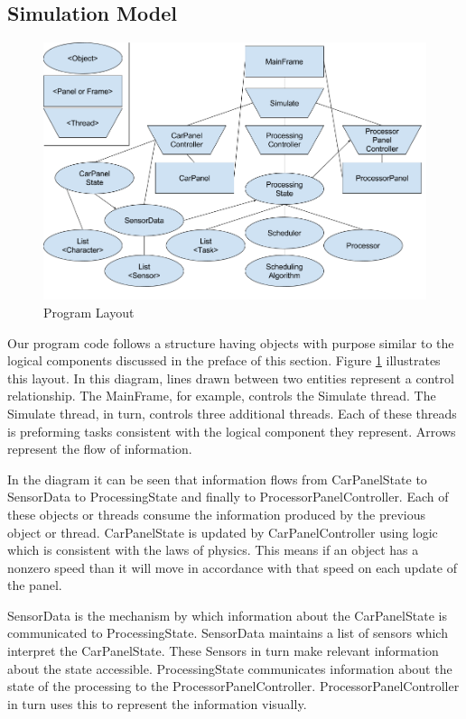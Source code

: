 \documentclass{article} %
\begin{document}
\subsection{Simulation Model}
\begin{figure}[!hbt]
\begin{center}
\includegraphics[width=.4\textwidth,keepaspectratio]{code_layout.png}
\end{center}
\caption{Program Layout}
\label{FIG-DIAGRAM}
\end{figure}

Our program code follows a structure having objects with purpose similar to the logical components discussed in the preface of this section.
Figure \ref{FIG-DIAGRAM} illustrates this layout.
In this diagram, lines drawn between two entities represent a control relationship. The MainFrame, for example, controls the Simulate thread.
The Simulate thread, in turn, controls three additional threads. Each of these threads is preforming tasks consistent with the logical component they represent.
Arrows represent the flow of information.

In the diagram it can be seen that information flows from CarPanelState to SensorData to ProcessingState and finally to ProcessorPanelController.
Each of these objects or threads consume the information produced by the previous object or thread.
CarPanelState is updated by CarPanelController using logic which is consistent with the laws of physics.
This means if an object has a nonzero speed than it will move in accordance with that speed on each update of the panel.

SensorData is the mechanism by which information about the CarPanelState is communicated to  ProcessingState.
SensorData maintains a list of sensors which interpret the CarPanelState. These Sensors in turn make relevant information about the state accessible.
ProcessingState communicates information about the state of the processing to the ProcessorPanelController.
ProcessorPanelController in turn uses this to represent the information visually.
\end{document}
